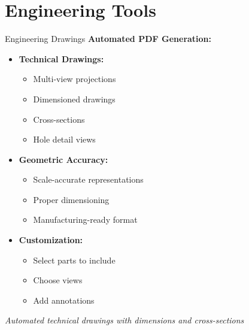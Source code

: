 \documentclass[aspectratio=169,10pt]{beamer}
\begin{document}
\section{Engineering Tools}

\begin{frame}{Engineering Drawings}
\textbf{Automated PDF Generation:}

\begin{itemize}
    \item \textbf{Technical Drawings:}
    \begin{itemize}
        \item Multi-view projections
        \item Dimensioned drawings
        \item Cross-sections
        \item Hole detail views
    \end{itemize}
    
    \item \textbf{Geometric Accuracy:}
    \begin{itemize}
        \item Scale-accurate representations
        \item Proper dimensioning
        \item Manufacturing-ready format
    \end{itemize}
    
    \item \textbf{Customization:}
    \begin{itemize}
        \item Select parts to include
        \item Choose views
        \item Add annotations
    \end{itemize}
\end{itemize}

\vspace{0.3cm}
\textit{Automated technical drawings with dimensions and cross-sections}
\end{frame}
\end{document}
